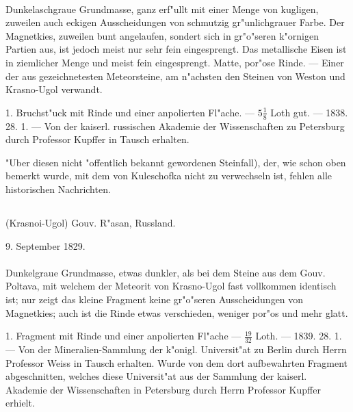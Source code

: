 \documentclass[a4paper, 11pt, oneside, polutonikogreek, german]{article}
\begin{document}
\paragraph{}
Dunkelaschgraue Grundmasse, ganz erf"ullt mit einer Menge von kugligen, zuweilen auch eckigen Ausscheidungen von schmutzig gr"unlichgrauer Farbe. Der Magnetkies, zuweilen bunt angelaufen, sondert sich in gr"o"seren k"ornigen Partien aus, ist jedoch meist nur sehr fein eingesprengt. Das metallische Eisen ist in ziemlicher Menge und meist fein eingesprengt. Matte, por"ose Rinde. --- Einer der aus gezeichnetesten Meteorsteine‚ am n"achsten den Steinen von Weston und Krasno-Ugol verwandt.

1. Bruchst"uck mit Rinde und einer anpolierten Fl"ache. --- $\mathfrak{5\frac{1}{8}}$ Loth gut. --- 1838. 28. 1. --- Von der kaiserl. russischen Akademie der Wissenschaften zu Petersburg durch Professor Kupffer in Tausch erhalten.

\setlength{\leftskip}{10mm}
\setlength{\parindent}{0pt}

{\footnotesize "Uber diesen nicht "offentlich bekannt gewordenen Steinfall), der, wie schon oben bemerkt wurde, mit dem von Kuleschofka nicht zu verwechseln ist, fehlen alle historischen Nachrichten.}

\setlength{\leftskip}{0pt}
\setlength{\parindent}{20pt}

\subsection{}
\begin{center}

(Krasnoi-Ugol) Gouv. R"asan, Russland.

9. September 1829.
\end{center}
\paragraph{}
Dunkelgraue Grundmasse, etwas dunkler, als bei dem Steine aus dem Gouv. Poltava, mit welchem der Meteorit von Krasno-Ugol fast vollkommen identisch ist; nur zeigt das kleine Fragment keine gr"o"seren Ausscheidungen von Magnetkies; auch ist die Rinde etwas verschieden, weniger por"os und mehr glatt.

1. Fragment mit Rinde und einer anpolierten Fl"ache --- $\mathfrak{\frac{19}{32}}$ Loth. --- 1839. 28. 1. --- Von der Mineralien-Sammlung der k"onigl. Universit"at zu Berlin durch Herrn Professor Weiss in Tausch erhalten. Wurde von dem dort aufbewahrten Fragment abgeschnitten, welches diese Universit"at aus der Sammlung der kaiserl. Akademie der Wissenschaften in Petersburg durch Herrn Professor Kupffer erhielt.
\end{document}
